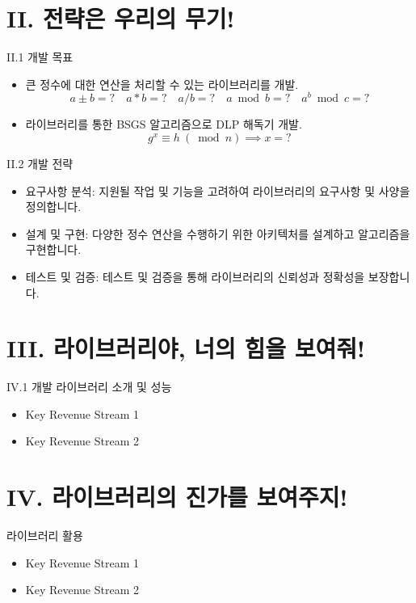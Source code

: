 \documentclass{beamer}
\begin{document}
\section{II. 전략은 우리의 무기!}
\begin{frame}{II.1 개발 목표}
	\begin{itemize}[<+->]
		\item 큰 정수에 대한 연산을 처리할 수 있는 라이브러리를 개발. \[
		a\pm b=?\quad a*b=?\quad a/b=?\quad a \bmod b=?\quad a^b\bmod{c}=?
		\]
		\item 라이브러리를 통한 BSGS 알고리즘으로 DLP 해독기 개발. \[
		g^x\equiv h\ (\bmod{n})\implies x=?
		\]
	\end{itemize}
\end{frame}
\begin{frame}{II.2 개발 전략}
	\begin{itemize}[<+->]
		\item 
		요구사항 분석: 지원될 작업 및 기능을 고려하여 라이브러리의 요구사항 및 사양을 정의합니다.
		\item 설계 및 구현: 다양한 정수 연산을 수행하기 위한 아키텍처를 설계하고 알고리즘을 구현합니다.
		\item 테스트 및 검증: 테스트 및 검증을 통해 라이브러리의 신뢰성과 정확성을 보장합니다.
	\end{itemize}
\end{frame}


\section{III. 라이브러리야, 너의 힘을 보여줘!}
\begin{frame}{IV.1 개발 라이브러리 소개 및 성능}
	\begin{itemize}[<+->]
		\item Key Revenue Stream 1
		\item Key Revenue Stream 2
	\end{itemize}
\end{frame}

\section{IV. 라이브러리의 진가를 보여주지!}
\begin{frame}{라이브러리 활용}
	\begin{itemize}[<+->]
		\item Key Revenue Stream 1
		\item Key Revenue Stream 2
	\end{itemize}
\end{frame}
\end{document}
